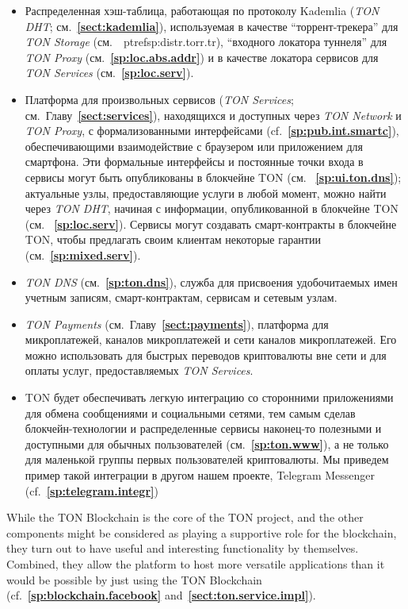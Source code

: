 \documentclass[12pt,oneside]{article}
\def\refpoint#1{{\rm\textbf{\ref{#1}}}}
\let\ptref=\refpoint
\begin{document}
\begin{Russian}
\begin{itemize}
    \item Распределенная хэш-таблица, работающая по протоколу Kademlia
        ({\em TON DHT}; см.~\ptref{sect:kademlia}), используемая в качестве
        ``торрент-трекера'' для {\em TON Storage} (см.~\ ptref{sp:distr.torr.tr}),
        ``входного локатора туннеля'' для {\em TON Proxy\/} (см.~\ptref{sp:loc.abs.addr})
        и в качестве локатора сервисов для {\em TON Services} (см.~\ptref{sp:loc.serv}).
    \item Платформа для произвольных сервисов ({\em TON Services};
        см.\ Главу~\ptref{sect:services}), находящихся и доступных через
        {\em TON Network\/} и {\em TON Proxy}, с формализованными интерфейсами
        (cf.~\ptref{sp:pub.int.smartc}), обеспечивающими взаимодействие с
        браузером или приложением для смартфона. Эти формальные интерфейсы
        и постоянные точки входа в сервисы могут быть опубликованы в блокчейне
        TON (см. ~\ptref{sp:ui.ton.dns}); актуальные узлы, предоставляющие
        услуги в любой момент, можно найти через {\em TON DHT\/}, начиная с
        информации, опубликованной в блокчейне TON (см. ~\ptref{sp:loc.serv}).
        Сервисы могут создавать смарт-контракты в блокчейне TON, чтобы предлагать
        своим клиентам некоторые гарантии (см.~\ptref{sp:mixed.serv}).
    \item {\em TON DNS\/} (см.~\ptref{sp:ton.dns}), служба для присвоения
        удобочитаемых имен учетным записям, смарт-контрактам, сервисам и сетевым узлам.
    \item {\em TON Payments\/} (см.\ Главу~\ptref{sect:payments}), платформа
        для микроплатежей, каналов микроплатежей и сети каналов микроплатежей.
        Его можно использовать для быстрых переводов криптовалюты вне сети и
        для оплаты услуг, предоставляемых {\em TON Services}.
    \item TON будет обеспечивать легкую интеграцию со сторонними приложениями
        для обмена сообщениями и социальными сетями, тем самым сделав
        блокчейн-технологии и распределенные сервисы наконец-то полезными и
        доступными для обычных пользователей (см.~\ptref{sp:ton.www}),
        а не только для маленькой группы первых пользователей криптовалюты.
        Мы приведем пример такой интеграции в другом нашем проекте,
        Telegram Messenger (cf.~\ptref{sp:telegram.integr})
    \end{itemize}
\end{Russian}

\begin{English}
    While the TON Blockchain is the core of the TON project, and the other
    components might be considered as playing a supportive role for the
    blockchain, they turn out to have useful and interesting functionality
    by themselves. Combined, they allow the platform to host more
    versatile applications than it would be possible by just using the TON
    Blockchain (cf.~\ptref{sp:blockchain.facebook}
    and~\ptref{sect:ton.service.impl}).
\end{English}
\end{document}
